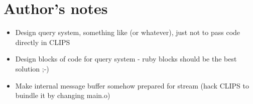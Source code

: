 \documentclass[a4paper,10pt]{article}
\begin{document}
\section{Author's notes}
\begin{itemize}
 \item Design query system, something like (or whatever), just not to pass code directly in CLIPS
 \item Design blocks of code for query system - ruby blocks should be the best solution ;-)
 \item Make internal message buffer somehow prepared for stream (hack CLIPS to buindle it by changing main.o)
\end{itemize}
\end{document}
